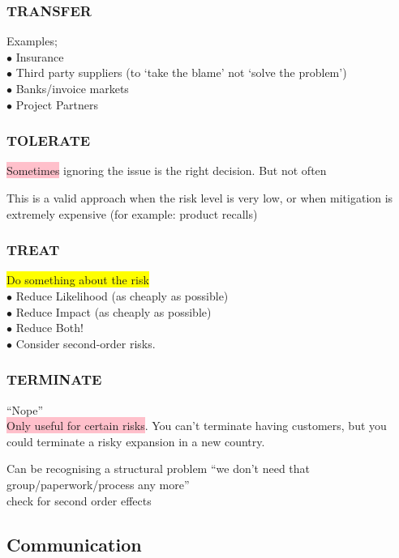\documentclass[tikz,border=10pt]{project_plan}
\newcommand{\bulletPoint}{\hspace{-3.1pt}$\bullet$ \hspace{5pt}}
\begin{document}
\subsubsection{TRANSFER}

Examples;\\
\bulletPoint Insurance \\
\bulletPoint Third party suppliers (to ‘take the blame’ not ‘solve the problem’)  \\
\bulletPoint Banks/invoice markets \\
\bulletPoint Project Partners

\subsubsection{TOLERATE}

\colorbox{pink}{Sometimes} ignoring the issue is the right decision. But not often

This is a valid approach when the risk level is very low, or when mitigation
is extremely expensive (for example: product recalls)

\subsubsection{TREAT}

\colorbox{yellow}{Do something about the risk}\\
\bulletPoint Reduce Likelihood (as cheaply as possible)  \\
\bulletPoint Reduce Impact (as cheaply as possible) \\
\bulletPoint Reduce Both! \\
\bulletPoint Consider second-order risks.

\subsubsection{TERMINATE}

“Nope”\\
\colorbox{pink}{Only useful for certain risks}. You can’t terminate having customers, but you
could terminate a risky expansion in a new country.

Can be recognising a structural problem “we don’t need that group/paperwork/process any more” \\
check for second order effects

\subsection{Communication}
\end{document}
